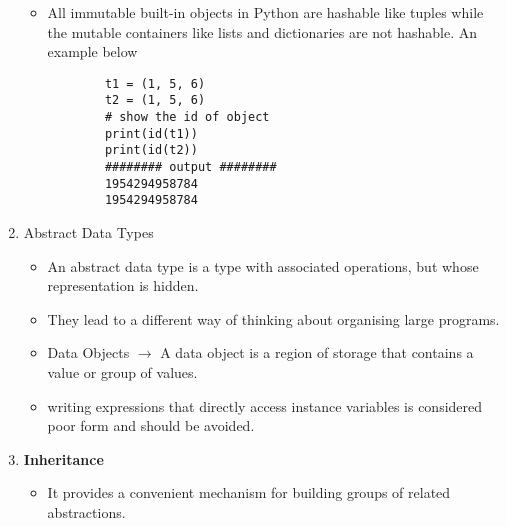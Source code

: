 \documentclass[11pt]{article}
\begin{document}
\begin{enumerate}
\begin{itemize}
            \item All immutable built-in objects in Python are hashable like tuples while the mutable containers like lists and dictionaries are not hashable. An example below
            \begin{verbatim}
        t1 = (1, 5, 6)
        t2 = (1, 5, 6)
        # show the id of object
        print(id(t1))
        print(id(t2))
        ######## output ########
        1954294958784
        1954294958784
            \end{verbatim}
        \end{itemize}
        \item Abstract Data Types
        \begin{itemize}
            \item  An abstract data type is a type with associated operations, but whose representation is hidden.
            \item They lead to a different way of thinking about organising large programs.
            \item Data Objects $\rightarrow$ A data object is a region of storage that contains a value or group of values.
            \item writing expressions that directly access instance variables is considered poor form and should be avoided.
        \end{itemize}
        \item \textbf{Inheritance}
        \begin{itemize}
            \item It provides a convenient mechanism for building groups of related abstractions.
        \end{itemize}
    \end{enumerate}
\end{document}
